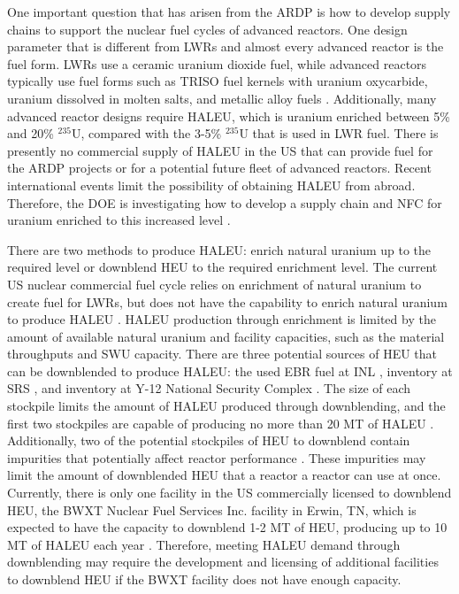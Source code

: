 One important question that has arisen from the \gls{ARDP} is how to
develop supply chains to support the nuclear fuel cycles of 
advanced reactors. One design parameter that is different from \glspl{LWR} 
and almost every advanced reactor is the fuel form. \glspl{LWR} use 
a ceramic uranium dioxide fuel, while advanced reactors typically use
fuel forms such as \gls{TRISO} fuel kernels with uranium oxycarbide, 
uranium dissolved in molten 
salts, and metallic alloy fuels \cite{hussain_advances_2018}.
Additionally, many advanced reactor designs require  
\acrfull{HALEU}, which is uranium enriched between 5\% and 20\% $^{235}$U,
compared with the 3-5\% $^{235}$U that is used in \gls{LWR} 
fuel. There is presently no commercial supply of \gls{HALEU} in the US that can 
provide fuel for the \gls{ARDP} projects or for a potential future fleet of 
advanced reactors. Recent international events limit the possibility of 
obtaining \gls{HALEU} from abroad. Therefore, the \gls{DOE} is investigating 
how to develop 
a supply chain and \gls{NFC} for uranium enriched to this 
increased level \cite{regalbuto_addressing_2020,dixon_estimated_2022}. 

There are two methods to produce \gls{HALEU}: enrich natural uranium up to 
the required level
or downblend \acrfull{HEU} to the required enrichment level. The current US
nuclear commercial fuel cycle relies on enrichment of natural uranium 
to create fuel for \glspl{LWR}, but does not have the capability to enrich
natural uranium to produce \gls{HALEU} \cite{nuclear_energy_institute_addressing_2018}.  
\gls{HALEU} production through enrichment is limited by
the amount of available natural uranium and facility capacities, such 
as the material throughputs and \acrfull{SWU} capacity.
There are three potential sources of \gls{HEU} that can be downblended 
to produce \gls{HALEU}: the used \gls{EBR} fuel at \gls{INL} 
\cite{patterson_haleu_2019}, inventory at \gls{SRS} \cite{regalbuto_addressing_2020}, 
and inventory at Y-12 National Security Complex 
\cite{robinson_establishment_2020}. The size of each stockpile limits the amount 
of \gls{HALEU} produced through downblending, and the first two stockpiles 
are capable of producing no more than 20 MT of \gls{HALEU}
\cite{regalbuto_addressing_2020}.
Additionally, two of the potential stockpiles of \gls{HEU} to downblend  
contain impurities that potentially affect reactor performance 
\cite{vaden_isotopic_2018,nelson_foreign_2010}.
These impurities may limit the amount of downblended \gls{HEU} that a reactor 
a reactor can use at once. 
Currently, there is only one facility in the US commercially licensed to 
downblend \gls{HEU}, the BWXT Nuclear Fuel Services Inc. facility in 
Erwin, TN, which is expected to have the capacity to downblend 1-2 
MT of \gls{HEU}, producing up to 10 MT of \gls{HALEU} each year \cite{nagley_ha-leu_2020}.
Therefore, meeting \gls{HALEU} demand through downblending may require the 
development and licensing of additional facilities to downblend \gls{HEU} if 
the BWXT facility does not have enough capacity. 


